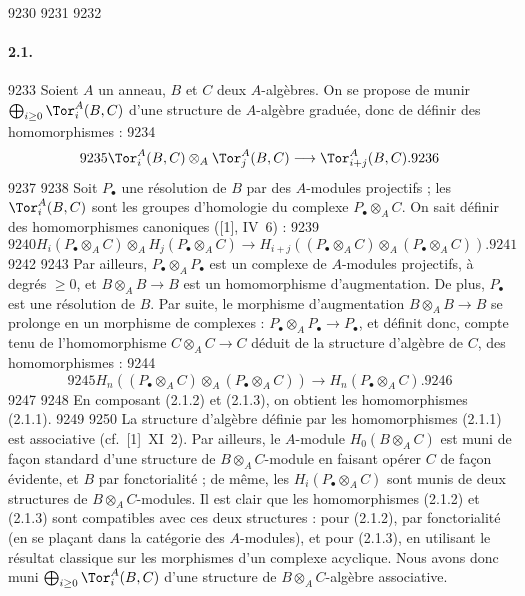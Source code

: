   9230	\setcounter{subsection}{0}
  9231	
  9232	\paragraph{2.1.}
  9233	Soient $A$ un anneau, $B$ et $C$ deux $A$-alg\`ebres. On se propose de munir $\bigoplus_{i \geq 0} \Tor_i^A(B,C)$ d'une structure de $A$-alg\`ebre gradu\'ee, donc de d\'efinir des homomorphismes :
  9234	\begin{equation}\label{eq:2.1.1}
  9235	\Tor_i^A(B,C) \otimes_A \Tor_j^A(B,C) \longrightarrow \Tor_{i+j}^A(B,C).
  9236	\end{equation}
  9237	
  9238	Soit $P_{\bullet}$ une r\'esolution de $B$ par des $A$-modules projectifs ; les $\Tor_i^A(B,C)$ sont les groupes d'homologie du complexe $P_{\bullet} \otimes_A C$. On sait d\'efinir des homomorphismes canoniques ([1], IV~6) :
  9239	\begin{equation}\label{eq:2.1.2}
  9240	H_i(P_{\bullet} \otimes_A C) \otimes_A H_j(P_{\bullet} \otimes_A C) \longrightarrow H_{i+j}((P_{\bullet} \otimes_A C) \otimes_A (P_{\bullet} \otimes_A C)).
  9241	\end{equation}
  9242	
  9243	Par ailleurs, $P_{\bullet} \otimes_A P_{\bullet}$ est un complexe de $A$-modules projectifs, \`a degr\'es $\geq 0$, et $B \otimes_A B \to B$ est un homomorphisme d'augmentation. De plus, $P_{\bullet}$ est une r\'esolution de $B$. Par suite, le morphisme d'augmentation $B \otimes_A B \to B$ se prolonge en un morphisme de complexes : $P_{\bullet} \otimes_A P_{\bullet} \to P_{\bullet}$, et d\'efinit donc, compte tenu de l'homomorphisme $C \otimes_A C \to C$ d\'eduit de la structure d'alg\`ebre de $C$, des homomorphismes :
  9244	\begin{equation}\label{eq:2.1.3}
  9245	H_n((P_{\bullet} \otimes_A C) \otimes_A (P_{\bullet} \otimes_A C)) \longrightarrow H_n(P_{\bullet} \otimes_A C).
  9246	\end{equation}
  9247	
  9248	En composant (2.1.2) et (2.1.3), on obtient les homomorphismes (2.1.1).
  9249	
  9250	La structure d'alg\`ebre d\'efinie par les homomorphismes (2.1.1) est associative (cf.~[1]~XI~2). Par ailleurs, le $A$-module $H_0(B \otimes_A C)$ est muni de fa\c{c}on standard d'une structure de $B \otimes_A C$-module en faisant op\'erer $C$ de fa\c{c}on \'evidente, et $B$ par fonctorialit\'e ; de m\^eme, les $H_i(P_{\bullet} \otimes_A C)$ sont munis de deux structures de $B \otimes_A C$-modules. Il est clair que les homomorphismes (2.1.2) et (2.1.3) sont compatibles avec ces deux structures : pour (2.1.2), par fonctorialit\'e (en se pla\c{c}ant dans la cat\'egorie des $A$-modules), et pour (2.1.3), en utilisant le r\'esultat classique sur les morphismes d'un complexe acyclique. Nous avons donc muni $\bigoplus_{i \geq 0} \Tor_i^A(B,C)$ d'une structure de $B \otimes_A C$-alg\`ebre associative.
